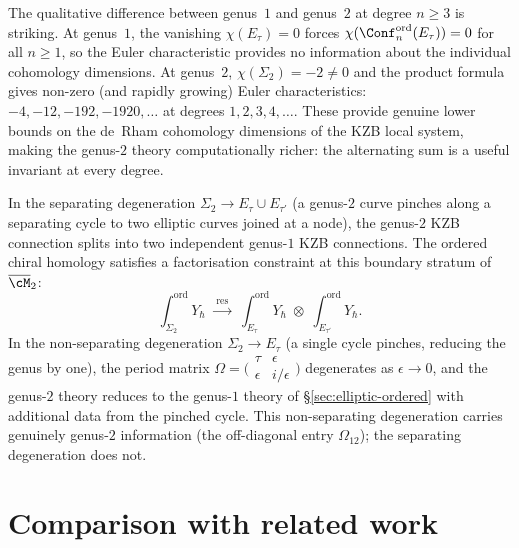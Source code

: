 \begin{remark}
\label{rem:g2-nonvanishing-chi}
The qualitative difference between genus~$1$ and genus~$2$
at degree $n \geq 3$ is striking. At genus~$1$, the
vanishing $\chi(E_\tau) = 0$ forces
$\chi(\Conf_n^{\mathrm{ord}}(E_\tau)) = 0$ for all
$n \geq 1$, so the Euler characteristic provides no
information about the individual cohomology dimensions.
At genus~$2$, $\chi(\Sigma_2) = -2 \neq 0$ and the product
formula gives non-zero (and rapidly growing) Euler
characteristics: $-4, -12, -192, -1920, \ldots$ at degrees
$1, 2, 3, 4, \ldots$. These provide genuine lower bounds on
the de~Rham cohomology dimensions of the KZB local system,
making the genus-$2$ theory computationally richer: the
alternating sum is a useful invariant at every degree.
\end{remark}

\begin{remark}
\label{rem:g2-degeneration}
In the separating degeneration
$\Sigma_2 \to E_\tau \cup E_{\tau'}$ (a genus-$2$ curve
pinches along a separating cycle to two elliptic curves
joined at a node), the genus-$2$ KZB connection splits into
two independent genus-$1$ KZB connections.
The ordered chiral homology satisfies
a factorisation constraint at this boundary stratum of
$\overline{\cM}_2$:
\[
  \int_{\Sigma_2}^{\mathrm{ord}} Y_\hbar
  \;\xrightarrow{\;\mathrm{res}\;}\;
  \int_{E_\tau}^{\mathrm{ord}} Y_\hbar
  \;\otimes\;
  \int_{E_{\tau'}}^{\mathrm{ord}} Y_\hbar.
\]
In the non-separating degeneration $\Sigma_2 \to E_\tau$
(a single cycle pinches, reducing the genus by one),
the period matrix
$\Omega = \bigl(\begin{smallmatrix}
\tau & \epsilon \\ \epsilon & i/\epsilon
\end{smallmatrix}\bigr)$
degenerates as $\epsilon \to 0$, and the genus-$2$ theory
reduces to the genus-$1$ theory of
\S\ref{sec:elliptic-ordered} with additional data from
the pinched cycle.
This non-separating degeneration carries genuinely
genus-$2$ information (the off-diagonal entry
$\Omega_{12}$); the separating degeneration does not.
\end{remark}


\section{Comparison with related work}
\label{sec:comparison}
